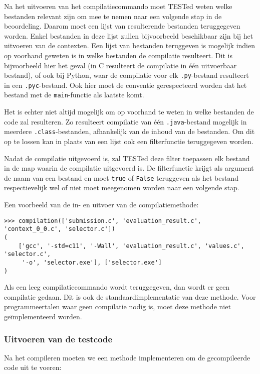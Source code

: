 Na het uitvoeren van het compilatiecommando moet TESTed weten welke bestanden relevant zijn om mee te nemen naar een volgende stap in de beoordeling.
Daarom moet een lijst van resulterende bestanden teruggegeven worden.
Enkel bestanden in deze lijst zullen bijvoorbeeld beschikbaar zijn bij het uitvoeren van de contexten.
Een lijst van bestanden teruggeven is mogelijk indien op voorhand geweten is in welke bestanden de compilatie resulteert.
Dit is bijvoorbeeld hier het geval (in C resulteert de compilatie in één uitvoerbaar bestand), of ook bij Python, waar de compilatie voor elk \texttt{.py}-bestand resulteert in een \texttt{.pyc}-bestand.
Ook hier moet de conventie gerespecteerd worden dat het bestand met de \texttt{main}-functie als laatste komt.

Het is echter niet altijd mogelijk om op voorhand te weten in welke bestanden de code zal resulteren.
Zo resulteert compilatie van één \texttt{.java}-bestand mogelijk in meerdere \texttt{.class}-bestanden, afhankelijk van de inhoud van de bestanden.
Om dit op te lossen kan in plaats van een lijst ook een filterfunctie teruggegeven worden.

Nadat de compilatie uitgevoerd is, zal TESTed deze filter toepassen elk bestand in de map waarin de compilatie uitgevoerd is.
De filterfunctie krijgt als argument de naam van een bestand en moet \texttt{true} of \texttt{False} teruggeven als het bestand respectievelijk wel of niet moet meegenomen worden naar een volgende stap.

Een voorbeeld van de in- en uitvoer van de compilatiemethode:

\begin{verbatim}
>>> compilation(['submission.c', 'evaluation_result.c', 'context_0_0.c', 'selector.c'])
(
    ['gcc', '-std=c11', '-Wall', 'evaluation_result.c', 'values.c', 'selector.c',
     '-o', 'selector.exe'], ['selector.exe']
)
\end{verbatim}

Als een leeg compilatiecommando wordt teruggegeven, dan wordt er geen compilatie gedaan.
Dit is ook de standaardimplementatie van deze methode.
Voor programmeertalen waar geen compilatie nodig is, moet deze methode niet geïmplementeerd worden.

\subsubsection{Uitvoeren van de testcode}

Na het compileren moeten we een methode implementeren om de gecompileerde code uit te voeren:

